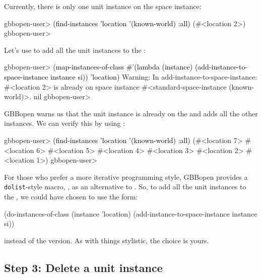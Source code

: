 \documentclass[10pt,twoside,english,pdftex]{article}
\begin{document}
%
%
Currently, there is only one  unit instance on the
 space instance:
%
\W\supp
\begin{example}
\textcolor{darkergray}{%
  gbbopen-user> \textcolor{black}{(find-instances 'location '(known-world) :all)}
  (#<location 2>)
  gbbopen-user>}
\end{example}

Let's use  to add all the
 unit instances to the :
%
\W\supp
\begin{example}
\textcolor{darkergray}{%
  gbbopen-user> \textcolor{black}{(map-instances-of-class 
                  #'(lambda (instance) 
                       (add-instance-to-space-instance instance si))
                 'location)}
  Warning: In add-instance-to-space-instance: #<location 2> is already on 
           space instance #<standard-space-instance (known-world)>.
  nil
  gbbopen-user>}
\end{example}
%
GBBopen warns us that the   unit instance is
already on the  and adds all the other
 instances.  We can verify this by using
:
%
\W\supp\notpretop
\begin{example}
\textcolor{darkergray}{%
  gbbopen-user> \textcolor{black}{(find-instances 'location '(known-world) :all)}
  (#<location 7> #<location 6> #<location 5> #<location 4> #<location 3>
   #<location 2> #<location 1>)
  gbbopen-user>}
\end{example}

%
For those who prefer a more iterative programming style, GBBopen provides a
\texttt{dolist}-style macro, , as an
alternative to .  So, to add all the
 unit instances to the , we
could have chosen to use the form:
%
\W\supp
\begin{example}
\textcolor{darkergray}{%
  (do-instances-of-class (instance 'location)
     (add-instance-to-space-instance instance si))}
\end{example}
%
instead of the  version.  As with things
stylistic, the choice is yours.

\subsection*{Step 3: Delete a unit instance}
\end{document}
